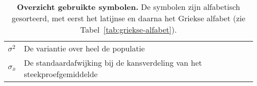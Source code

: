\begin{table}
\begin{tabular}{p{}p{}}
  	$\sigma^2$                                              & De variantie over heel de populatie                                                                                                    \\
  	$\sigma_{\overline{x}}$                                 & De standaardafwijking bij de kansverdeling van het steekproefgemiddelde                                                                \\
  	\bottomrule
  \end{tabular}
  \caption[Overzicht gebruikte symbolen.]{\textbf{Overzicht gebruikte symbolen.} De symbolen zijn alfabetisch gesorteerd, met eerst het latijnse en daarna het Griekse alfabet (zie Tabel~\ref{tab:griekse-alfabet}).}
  \label{tab:notatie}
\end{table}

